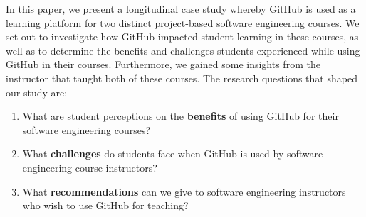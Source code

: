 In this paper, we present a longitudinal case study whereby GitHub is used as a learning platform for two distinct project-based software engineering courses. We set out to investigate how GitHub impacted student learning in these courses, as well as to determine the benefits and challenges students experienced while using GitHub in their courses.  Furthermore, we gained some insights from the instructor that taught both of these courses.
%
%
%
The research questions that shaped our study are:%
\begin{enumerate}
\item What are student perceptions on the \textbf{benefits} of using GitHub for their software engineering courses?
\item What \textbf{challenges} do students face when GitHub is used by software engineering course instructors?
\item What \textbf{recommendations} can we give to software engineering instructors who wish to use GitHub for teaching?
\end{enumerate}

